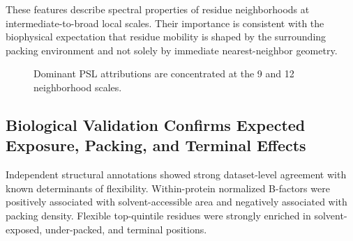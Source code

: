 \documentclass[11pt]{article}
\newcommand{\angstrom}{\text{\normalfont\AA}\xspace}
\begin{document}
These features describe spectral properties of residue neighborhoods at intermediate-to-broad local scales. Their importance is consistent with the biophysical expectation that residue mobility is shaped by the surrounding packing environment and not solely by immediate nearest-neighbor geometry.

\begin{figure}[htbp]
\centering
{}
\caption{Dominant PSL attributions are concentrated at the 9 and 12~\angstrom neighborhood scales.}
\label{fig:shap_importance}
\end{figure}

\subsection{Biological Validation Confirms Expected Exposure, Packing, and Terminal Effects}
Independent structural annotations showed strong dataset-level agreement with known determinants of flexibility. Within-protein normalized B-factors were positively associated with solvent-accessible area and negatively associated with packing density. Flexible top-quintile residues were strongly enriched in solvent-exposed, under-packed, and terminal positions.
\end{document}

